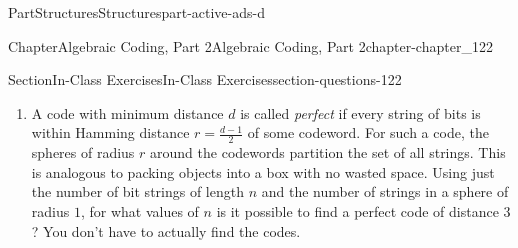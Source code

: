 \documentclass[oneside,10pt,]{book}
\numberwithin{equation}{section}
\providecommand\phantomsection{}
\begin{document}
\begin{partptx}{Part}{Structures}{}{Structures}{}{}{part-active-ads-d}
\begin{chapterptx}{Chapter}{Algebraic Coding, Part 2}{}{Algebraic Coding, Part 2}{}{}{chapter-chapter_122}
\begin{sectionptx}{Section}{In-Class Exercises}{}{In-Class Exercises}{}{}{section-questions-122}
\begin{enumerate}[label=\arabic*.]
\begin{enumerate}[label=(\alph*)]
\item{}Rectangular codes are linear codes.  For the 3 by 2 rectangular code, what are the generator and parity check matrices?%
\end{enumerate}
%
\item{}A code with minimum distance \(d\) is called \emph{perfect} if every string of bits is within Hamming distance \(r=\frac{d-1}{2}\) of some codeword. For such a code, the spheres of radius \(r\) around the codewords partition the set of all strings.  This is analogous to packing objects into a box with no wasted space.  Using just the number of bit strings of length \(n\) and the number of strings in a sphere of radius \(1\), for what values of \(n\) is it possible to find a perfect code of distance \(3\)?  You don't have to actually find the codes.%
\end{enumerate}
%
\end{sectionptx}
\end{chapterptx}
\end{partptx}
%
\backmatter%
%
\clearpage\phantomsection%
%
%
%
\typeout{************************************************}
\typeout{************************************************}
%
\end{document}
